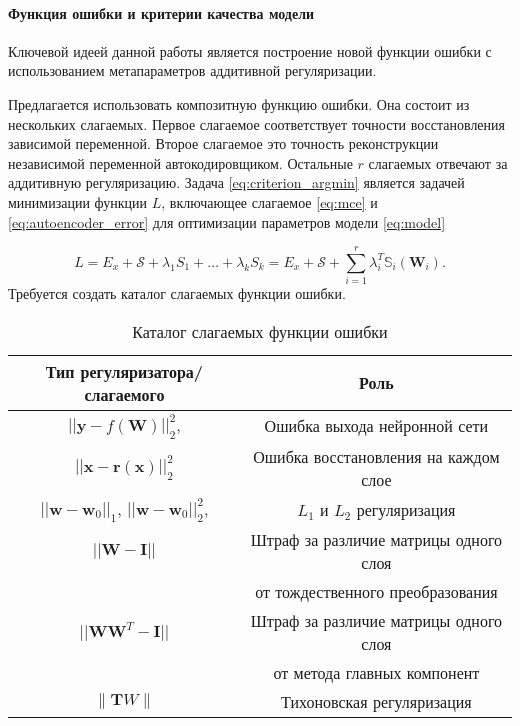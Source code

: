 \documentclass[12pt, twoside]{article}
\newcommand{\xb}{{\mathbf{x}}}
\newcommand{\Smi}{{\mathcal{S}}}
\newcommand{\w}{{\mathbf{W}}}
\newcommand{\wm}{{\mathbf{w}}}
\begin{document}
\paragraph{Функция ошибки и критерии качества модели}

Ключевой идеей данной работы является построение новой функции ошибки с использованием метапараметров аддитивной регуляризации. 

Предлагается использовать композитную функцию ошибки. Она состоит из нескольких слагаемых. Первое слагаемое соответствует точности восстановления зависимой переменной. Второе слагаемое это точность реконструкции независимой переменной автокодировщиком. Остальные $r$ слагаемых отвечают за аддитивную регуляризацию. Задача \eqref{eq:criterion_argmin} является задачей минимизации функции $L$, включающее слагаемое \eqref{eq:mce} и \eqref{eq:autoencoder_error} для оптимизации параметров модели \eqref{eq:model}

\begin{equation}\label{eq:error_function}
L = E_x + \Smi + \lambda_1S_1+\dots+\lambda_kS_k = E_x + \Smi + \sum\limits_{i = 1}^r\mathbb{\lambda}_i^T\mathbb{S}_i(\mathbf{W}_i).
\end{equation}
Требуется создать каталог слагаемых функции ошибки.
\begin{table}[h!]
\begin{center}
\begin{tabular}{|c|c|}
\hline
  Тип регуляризатора/слагаемого   & Роль  \\
  \hline
  $||\mathbf{y} - f(\w)||^2_2 $,   & Ошибка выхода нейронной сети \\
  \hline
  $||\xb-\mathbf{r}(\xb)||^2_2$ & Ошибка восстановления на каждом слое \\
  \hline
  $||\wm-\wm_0||_1$, $||\wm-\wm_0||^2_2$, & $L_1$ и $L_2$ регуляризация\\
  \hline
  $||\w-\mathbf{I}||$ & Штраф за различие матрицы одного слоя \\
  & от тождественного преобразования \\
  \hline
  $||\w\w^T-\mathbf{I}||$ & Штраф за различие матрицы одного слоя \\
  & от метода главных компонент \\
  \hline
  $\|\mathbf{T}W\|$ & Тихоновская регуляризация\\
  \hline
\end{tabular}
\caption{Каталог слагаемых функции ошибки}
\end{center}
\end{table}
\end{document}
